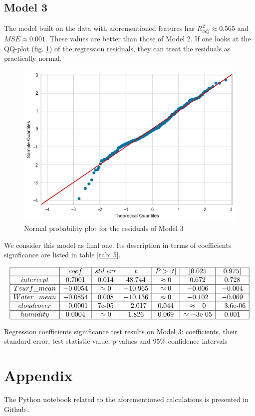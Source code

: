 \documentclass[12pt, bachelor, substylefile = algo_title.rtx]{disser}
\theoremstyle{definition}
\begin{document}
\subsection{Model 3}
The model built on the data with aforementioned features has $R^2_{adj} \approx 0.565$ and $MSE \approx 0.001$. These values are better than those of Model 2. If one looks at the QQ-plot (fig. \ref{fig: 14}) of the regression residuals, they can treat the residuals as practically normal.

\begin{figure}[!h]
\centering
   \begin{minipage}{0.7\textwidth}
     \includegraphics[width=\linewidth]{res4}
   \end{minipage}
\caption{Normal probability plot for the residuals of Model 3}
\label{fig: 14}
\end{figure}

 We consider this model as final one. Its description in terms of coefficients significance are listed in table \ref{tab: 5}.

\begin{table}[!h]
$$
\begin{array}{|c|c|c|c|c|c|c|}
\hline
 & coef & std\ err & t & P>|t| & [0.025 & 0.975]\\
\hline
intercept & 0.7001 & 0.014 & 48.744 & \approx 0 & 0.672 & 0.728\\
\hline
Tsurf\_mean & -0.0054 & \approx 0 & -10.965 & \approx 0 & -0.006 & -0.004\\
\hline
Water\_mean & -0.0854 & 0.008 & -10.136 & \approx 0 & -0.102 & -0.069\\
\hline
cloudcover & -0.0001 & 7\text{e-05} & -2.017 & 0.044 & \approx -0 & -3.6\text{e-06}\\
\hline
humidity & 0.0004 & \approx 0 & 1.826 & 0.069 & \approx -3\text{e-05} & 0.001\\
\hline
\end{array}
$$

\caption{Regression coefficients significance test results on Model 3: coefficients, their standard error, test statistic value, p-values and 95\% confidence intervals}
\label{tab: 5}
\end{table}

\section{Appendix}
The Python notebook related to the aforementioned calculations is presented in Github \cite{repogithub}.

{\small }

\end{document}
